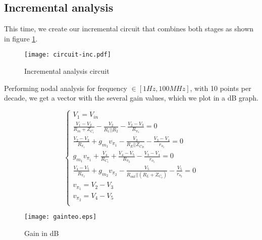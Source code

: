 \newpage

\subsection{Incremental analysis}

This time, we create our incremental circuit that combines both stages as shown in figure \ref{fig:circuit-inc}.


\begin{figure}[H] \centering
\texttt{[image: circuit-inc.pdf]}
\caption{Incremental analysis circuit}
\label{fig:circuit-inc}
\end{figure}

Performing nodal analysis for frequency $\in [1Hz, 100MHz]$, with 10 points per decade, we get a vector with the several gain values, which we plot in a dB graph.

\begin{equation} 
\begin{cases}
    V_1 = V_{in} \\
    \frac{V_1 - V_2}{R_{in} + Z_{C_i}} - \frac{V_2}{R_1 || R_2} - \frac{V_2 - V_3}{R_{\pi_1}} = 0 \\
    \frac{V_2 - V_3}{R_{\pi_1}} + g_{m_1} v_{\pi_1} - \frac{V_3}{R_E || Z_{C_B}} - \frac{V_3 - V_4}{r_{o_1}} = 0 \\
    g_{m_1} v_{\pi_1} + \frac{V_4}{R_{C_1}} + \frac{V_4 - V_5}{R_{\pi_2}} - \frac{V_3 - V_4}{r_{o_1}} = 0 \\
    \frac{V_4 - V_5}{R_{\pi_2}} + g_{m_2} v_{\pi_2} - \frac{V_5}{R_{out} || (R_L + Z_{C_o})} - \frac{V_5}{r_{o_2}} = 0 \\
    v_{\pi_1} = V_2 - V_3 \\
    v_{\pi_2} = V_4 - V_5 \\    
\end{cases}
\end{equation}

\begin{figure}[H] \centering
\texttt{[image: gainteo.eps]}
\caption{Gain in dB}
\label{fig:grafteo}
\end{figure}
